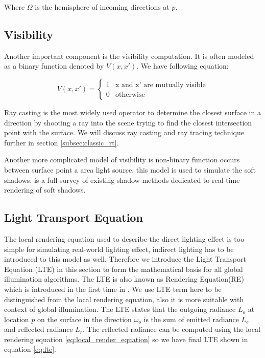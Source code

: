 Where \(\Omega\) is the hemisphere of incoming directions at \(p\).

\subsection{Visibility} 
Another important component is the visibility computation. It is often modeled as a binary function denoted by \(V(x, x')\). 
We have following equation: 

  \begin{equation}
    V(x, x')=\left\{
    \begin{array}{ll}
      1  & \text{x and x' are mutually visible} \\
      0  & \text{otherwise}
    \end{array}
    \right.
  \end{equation}

Ray casting is the most widely used operator to determine the closest surface in a direction by shooting a ray into the scene trying to find the closest intersection point with the surface. We will discuss ray casting and ray tracing technique further in section \ref{subsec:classic_rt}.

Another more complicated model of visibility is non-binary function occurs between surface point a area light source, this model is used to simulate the soft shadows.  \cite{Hasenfratz2003} is a full survey of existing shadow methods dedicated to real-time rendering of soft shadows. 

\subsection{Light Transport Equation} 

The local rendering equation used to describe the direct lighting effect is too simple for simulating real-world lighting effect, indirect lighting has to be introduced to this model as well. Therefore we introduce the Light Transport Equation (LTE) in this section to form the mathematical basis for all global illumination algorithms. The LTE is also known as Rendering Equation(RE) which is introduced in the first time in \cite{Kajiya:1986:RE:15922.15902}. We use LTE term here to be distinguished from the local rendering equation, also it is more suitable with context of global illumination. The LTE states that the outgoing radiance \(L_{o}\) at location \(p\) on the surface in the direction \(\omega_{o}\) is the sum of emitted radiance \(L_{e}\) and reflected radiance \(L_{r}\). The reflected radiance can be computed using the local rendering equation \ref{eq:local_render_equation} so we have final LTE shown in equation \ref{eq:lte}. 

